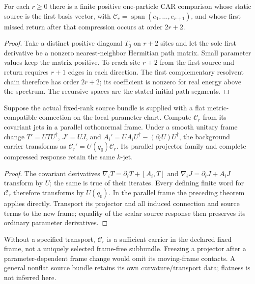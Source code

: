 \documentclass[12pt,a4paper]{article}
\begin{document}
\begin{corollary}
\label{paper4c:corollary:atlas-the-derivative-depth-bound-is-sharp-in-general-36af441}%

For each $r\ge0$ there is a finite positive one-particle CAR comparison
whose static source is the first basis vector, with
$\mathscr C_r=\operatorname{span}(e_1,\ldots,e_{r+1})$, and whose first
missed return after that compression occurs at order $2r+2$.
\end{corollary}
\begin{proof}
Take a distinct positive diagonal $T_0$ on $r+2$ sites and let the sole
first derivative be a nonzero nearest-neighbor Hermitian path matrix.
Small parameter values keep the matrix positive. To reach site $r+2$
from the first source and return requires $r+1$ edges in each direction.
The first complementary resolvent chain therefore has order $2r+2$;
its coefficient is nonzero for real energy above the spectrum. The
recursive spaces are the stated initial path segments.
\end{proof}

\begin{corollary}
\label{p4:cor:v251-jet-carrier-frame-covariance}
Suppose the actual fixed-rank source bundle is supplied with a flat
metric-compatible connection on the local parameter chart. Compute
$\mathscr C_r$ from its covariant jets in a parallel orthonormal frame.
Under a smooth unitary frame change $T'=UTU^\dagger$, $J'=UJ$, and
$A_i'=UA_iU^\dagger-(\partial_iU)U^\dagger$, the background carrier
transforms as $\mathscr C_r'=U(q_0)\mathscr C_r$. Its parallel projector
family and complete compressed response retain the same $k$-jet.
\end{corollary}
\begin{proof}
The covariant derivatives $\nabla_iT=\partial_iT+[A_i,T]$ and
$\nabla_iJ=\partial_iJ+A_iJ$ transform by $U$; the same is true of
their iterates. Every defining finite word for $\mathscr C_r$ therefore
transforms by $U(q_0)$. In the parallel frame the preceding theorem
applies directly. Transport its projector and all induced connection and
source terms to the new frame; equality of the scalar source response
then preserves its ordinary parameter derivatives.
\end{proof}

Without a specified transport, $\mathscr C_r$ is a sufficient carrier
in the declared fixed frame, not a uniquely selected frame-free
subbundle. Freezing a projector after a parameter-dependent frame change
would omit its moving-frame contacts. A general nonflat source bundle
retains its own curvature/transport data; flatness is not inferred here.
\end{document}
